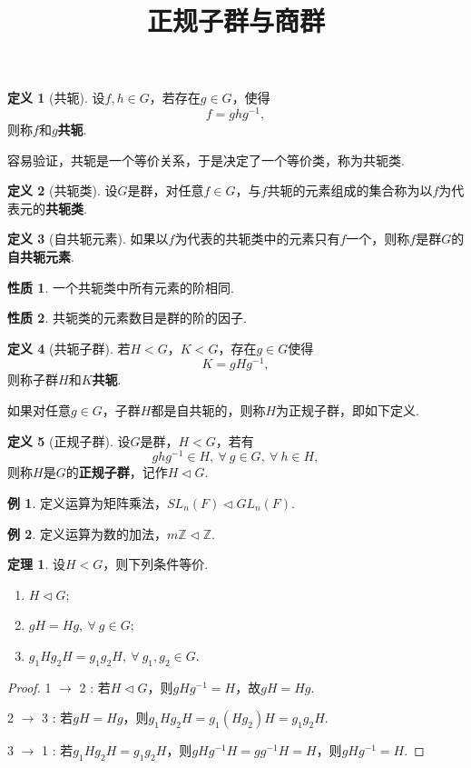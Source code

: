 \documentclass[12pt]{ctexart}
\title{\vspace{-2em}\textbf{正规子群与商群}\vspace{-2em}}
\date{ }
\theoremstyle{definition}
\newtheorem{definition}{定义}
\newtheorem{theorem}{定理}
\newtheorem{property}{性质}
\newtheorem{example}{例}
\theoremstyle{plain}
\begin{document}
	\maketitle
	\begin{definition}[共轭]
		设$f,h\in G$，若存在$g\in G$，使得
		$$f=ghg^{-1},$$
		则称$f$和$g$\textbf{共轭}.
	\end{definition}
	容易验证，共轭是一个等价关系，于是决定了一个等价类，称为共轭类.
	\begin{definition}[共轭类]
		设$G$是群，对任意$f\in G$，与$f$共轭的元素组成的集合称为以$f$为代表元的\textbf{共轭类}.
	\end{definition}
	\begin{definition}[自共轭元素]
		如果以$f$为代表的共轭类中的元素只有$f$一个，则称$f$是群$G$的\textbf{自共轭元素}.
	\end{definition}
	\begin{property}
		一个共轭类中所有元素的阶相同.
	\end{property}
	\begin{property}
		共轭类的元素数目是群的阶的因子.
	\end{property}
	\begin{definition}[共轭子群]
		若$H<G$，$K<G$，存在$g\in G$使得
		$$K=gHg^{-1},$$
		则称子群$H$和$K$\textbf{共轭}.
	\end{definition}
	如果对任意$g\in G$，子群$H$都是自共轭的，则称$H$为正规子群，即如下定义.
	\begin{definition}[正规子群]
		设$G$是群，$H<G$，若有
		$$ghg^{-1}\in H,\ \forall\ g\in G,\ \forall\ h\in H,$$
		则称$H$是$G$的\textbf{正规子群}，记作$H\vartriangleleft G$.
	\end{definition}
	\begin{example}
		定义运算为矩阵乘法，$SL_n(F)\vartriangleleft GL_n(F)$.
	\end{example}
	\begin{example}
		定义运算为数的加法，$m\mathbb{Z}\vartriangleleft \mathbb{Z}$.
	\end{example}
	\begin{theorem}
		设$H<G$，则下列条件等价.
		\begin{enumerate}
			\item $H\vartriangleleft G$;
			\item $gH=Hg,\ \forall\ g\in G$;
			\item $g_1Hg_2H=g_1g_2H,\ \forall\ g_1,g_2\in G$.
		\end{enumerate}
	\end{theorem}
	\begin{proof}
		1 $\to$ 2 : 若$H\vartriangleleft G$，则$gHg^{-1}=H$，故$gH=Hg$.
		
		2 $\to$ 3 : 若$gH=Hg$，则$g_1Hg_2H=g_1(Hg_2)H=g_1g_2H$.
		
		3 $\to$ 1 : 若$g_1Hg_2H=g_1g_2H$，则$gHg^{-1}H=gg^{-1}H=H$，则$gHg^{-1}=H$.
	\end{proof}
\end{document}

